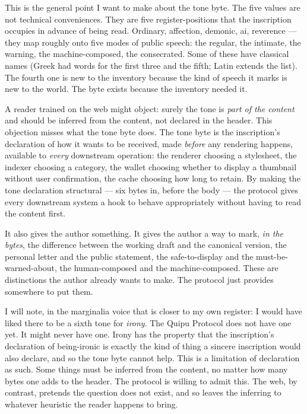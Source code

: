 \documentclass[11pt,openany]{book}
\begin{document}
This is the general point I want to make about the tone byte. The five values are not technical conveniences. They are five register-positions that the inscription occupies in advance of being read. Ordinary, affection, demonic, ai, reverence — they map roughly onto five modes of public speech: the regular, the intimate, the warning, the machine-composed, the consecrated. Some of these have classical names (Greek had words for the first three and the fifth; Latin extends the list). The fourth one is new to the inventory because the kind of speech it marks is new to the world. The byte exists because the inventory needed it.

A reader trained on the web might object: surely the tone is \emph{part of the content} and should be inferred from the content, not declared in the header. This objection misses what the tone byte does. The tone byte is the inscription's declaration of how it wants to be received, made \emph{before} any rendering happens, available to \emph{every} downstream operation: the renderer choosing a stylesheet, the indexer choosing a category, the wallet choosing whether to display a thumbnail without user confirmation, the cache choosing how long to retain. By making the tone declaration structural — six bytes in, before the body — the protocol gives every downstream system a hook to behave appropriately without having to read the content first.

It also gives the author something. It gives the author a way to mark, \emph{in the bytes}, the difference between the working draft and the canonical version, the personal letter and the public statement, the safe-to-display and the must-be-warned-about, the human-composed and the machine-composed. These are distinctions the author already wants to make. The protocol just provides somewhere to put them.

I will note, in the marginalia voice that is closer to my own register: I would have liked there to be a sixth tone for \emph{irony}. The Quipu Protocol does not have one yet. It might never have one. Irony has the property that the inscription's declaration of being-ironic is exactly the kind of thing a sincere inscription would also declare, and so the tone byte cannot help. This is a limitation of declaration as such. Some things must be inferred from the content, no matter how many bytes one adds to the header. The protocol is willing to admit this. The web, by contrast, pretends the question does not exist, and so leaves the inferring to whatever heuristic the reader happens to bring.
\end{document}
